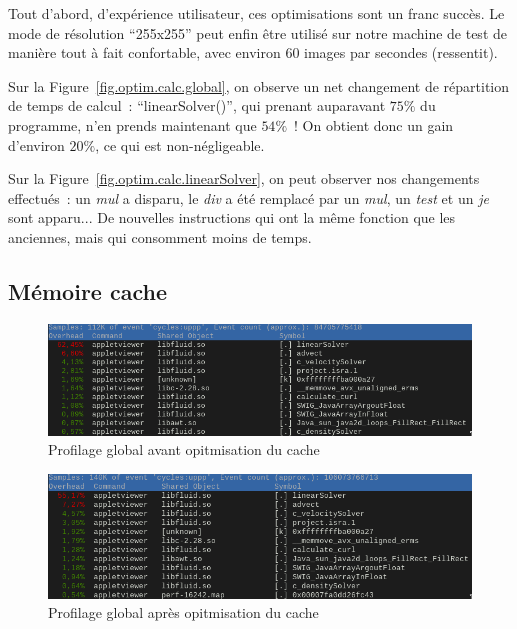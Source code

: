 \documentclass[12pt,a4paper]{article}
\begin{document}
Tout d'abord, d'expérience utilisateur, ces optimisations sont un franc succès.
Le mode de résolution \enquote{255x255} peut enfin être utilisé sur
notre machine de test de manière tout à fait confortable, avec environ 60 images
par secondes (ressentit).

Sur la Figure~\ref{fig.optim.calc.global}, on observe un net changement de
répartition de temps de calcul : \enquote{linearSolver()}, qui prenant
auparavant $75\%$ du programme, n'en prends maintenant que $54\%$ ! On obtient
donc un gain d'environ $20\%$, ce qui est non-négligeable.

Sur la Figure~\ref{fig.optim.calc.linearSolver}, on peut observer nos
changements effectués : un \textit{mul} a disparu, le \textit{div} a été
remplacé par un \textit{mul}, un \textit{test} et un \textit{je} sont apparu...
De nouvelles instructions qui ont la même fonction que les anciennes, mais qui
consomment moins de temps.

\subsection{Mémoire cache}
\label{sub.optim.cache}

\begin{figure}
    \centering
    \includegraphics[scale=0.50]{figures/optims/cache/global-before.png}
    \caption{Profilage global avant opitmisation du cache}
    \label{fig.optim.cache.before}
\end{figure}

\begin{figure}
    \centering
    \includegraphics[scale=0.55]{figures/optims/cache/global-after.png}
    \caption{Profilage global après opitmisation du cache}
    \label{fig.optim.cache.after}
\end{figure}
\end{document}
